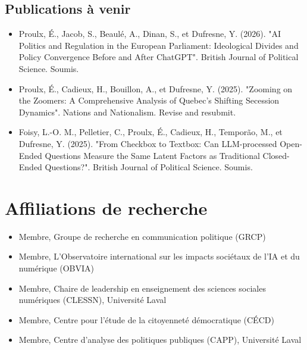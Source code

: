\documentclass[11pt,letterpaper,sans]{moderncv}        %
\begin{document}
\subsection{\textbf{Publications à venir}}
\begin{itemize}
    \item Proulx, É., Jacob, S., Beaulé, A., Dinan, S., et Dufresne, Y. (2026). "AI Politics and Regulation in the European Parliament: Ideological Divides and Policy Convergence Before and After ChatGPT". British Journal of Political Science. Soumis.
    \item Proulx, É., Cadieux, H., Bouillon, A., et Dufresne, Y. (2025). "Zooming on the Zoomers: A Comprehensive Analysis of Quebec's Shifting Secession Dynamics". Nations and Nationalism. Revise and resubmit.
    \item Foisy, L.-O. M., Pelletier, C., Proulx, É., Cadieux, H., Temporão, M., et Dufresne, Y. (2025). "From Checkbox to Textbox: Can LLM-processed Open-Ended Questions Measure the Same Latent Factors as Traditional Closed-Ended Questions?". British Journal of Political Science. Soumis.

\end{itemize}

\section{Affiliations de recherche}
\begin{itemize}
  \item Membre, Groupe de recherche en communication politique (GRCP)
  \item Membre, L'Observatoire international sur les impacts sociétaux de l'IA et du numérique (OBVIA)
  \item Membre, Chaire de leadership en enseignement des sciences sociales numériques (CLESSN), Université Laval
  \item Membre, Centre pour l'étude de la citoyenneté démocratique (CÉCD)
  \item Membre, Centre d'analyse des politiques publiques (CAPP), Université Laval
\end{itemize}
\end{document}
